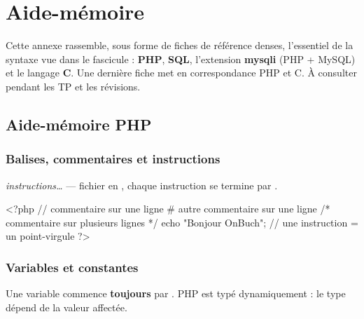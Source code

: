 \chapter{Aide-mémoire}

\begin{synthese}
Cette annexe rassemble, sous forme de fiches de référence denses, l'essentiel de
la syntaxe vue dans le fascicule : \textbf{PHP}, \textbf{SQL}, l'extension
\textbf{mysqli} (PHP + MySQL) et le langage \textbf{C}. Une dernière fiche met en
correspondance PHP et C. À consulter pendant les TP et les révisions.
\end{synthese}

\section{Aide-mémoire PHP}

\subsection{Balises, commentaires et instructions}

\begin{syntaxe}
\quad \textit{instructions\dots}\quad {} \qquad — fichier en
, chaque instruction se termine par \code{;}.
\end{syntaxe}

\begin{codephp}
<?php
  // commentaire sur une ligne
  # autre commentaire sur une ligne
  /* commentaire
     sur plusieurs lignes */
  echo "Bonjour OnBuch";   // une instruction = un point-virgule
?>
\end{codephp}

\subsection{Variables et constantes}

Une variable commence \textbf{toujours} par \code{\$}. PHP est typé
dynamiquement : le type dépend de la valeur affectée.


